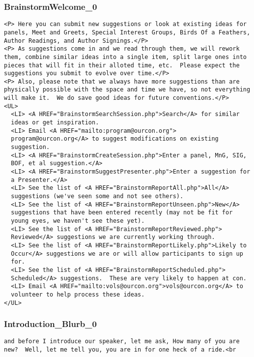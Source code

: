 \documentclass[captions=tablesignature]{scrartcl}
\begin{document}
\subsubsection{BrainstormWelcome\_0}
\label{sec-3-5-1}
\begin{verbatim}
<P> Here you can submit new suggestions or look at existing ideas for
panels, Meet and Greets, Special Interest Groups, Birds Of a Feathers,
Author Readings, and Author Signings.</P>
<P> As suggestions come in and we read through them, we will rework
them, combine similar ideas into a single item, split large ones into
pieces that will fit in their alloted time, etc.  Please expect the
suggestions you submit to evolve over time.</P>
<P> Also, please note that we always have more suggestions than are
physically possible with the space and time we have, so not everything
will make it.  We do save good ideas for future conventions.</P>
<UL>
  <LI> <A HREF="BrainstormSearchSession.php">Search</A> for similar
  ideas or get inspiration.
  <LI> Email <A HREF="mailto:program@ourcon.org">
  program@ourcon.org</A> to suggest modifications on existing
  suggestion.
  <LI> <A HREF="BrainstormCreateSession.php">Enter a panel, MnG, SIG,
  BOF, et al suggestion.</A>
  <LI> <A HREF="BrainstormSuggestPresenter.php">Enter a suggestion for
  a Presenter.</A>
  <LI> See the list of <A HREF="BrainstormReportAll.php">All</A>
  suggestions (we've seen some and not see others).
  <LI> See the list of <A HREF="BrainstormReportUnseen.php">New</A>
  suggestions that have been entered recently (may not be fit for
  young eyes, we haven't see these yet).
  <LI> See the list of <A HREF="BrainstormReportReviewed.php">
  Reviewed</A> suggestions we are currently working through.
  <LI> See the list of <A HREF="BrainstormReportLikely.php">Likely to
  Occur</A> suggestions we are or will allow participants to sign up
  for.
  <LI> See the list of <A HREF="BrainstormReportScheduled.php">
  Scheduled</A> suggestions.  These are very likely to happen at con.
  <LI> Email <A HREF="mailto:vols@ourcon.org">vols@ourcon.org</A> to
  volunteer to help process these ideas.
</UL>
\end{verbatim}

\subsubsection{Introduction\_Blurb\_0}
\label{sec-3-5-2}
\begin{verbatim}
and before I introduce our speaker, let me ask, How many of you are
new?  Well, let me tell you, you are in for one heck of a ride.<br
\end{verbatim}
\end{document}
